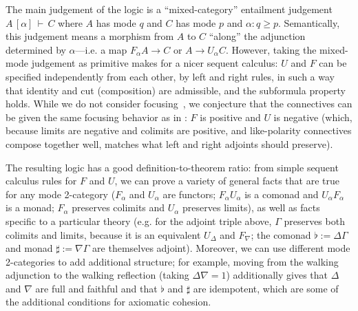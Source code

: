 \documentclass{drl-common/llncs}
\newcommand\seq[3]{\ensuremath{#1 \, [ #2 ] \, \vdash \, #3}}
\begin{document}
The main judgement of the logic is a ``mixed-category'' entailment
judgement \seq{A}{\alpha}{C} where $A$ has mode $q$ and $C$ has mode $p$
and $\alpha : q \ge p$.  Semantically, this judgement means a morphism
from $A$ to $C$ ``along'' the adjunction determined by $\alpha$---i.e. a
map $F_\alpha A \to C$ or $A \to U_\alpha C$.
However, taking the mixed-mode judgement as
primitive makes for a nicer sequent calculus: $U$ and $F$ can be
specified independently from each other, by left and right rules, in
such a way that identity and cut (composition) are admissible, and the
subformula property holds.  While we do not consider
focusing~\citep{andreoli92focus}, we conjecture that the connectives can
be given the same focusing behavior as in \citep{reed09adjoint}: $F$ is
positive and $U$ is negative (which, because limits are negative and
colimits are positive, and like-polarity connectives compose together
well, matches what left and right adjoints should preserve).

The resulting logic has a good definition-to-theorem ratio: from 
simple sequent calculus rules for $F$ and $U$, we can prove a variety of
general facts that are true for any mode 2-category ($F_\alpha$ and
$U_\alpha$ are functors; $F_\alpha U_\alpha$ is a comonad and $U_\alpha
F_\alpha$ is a monad; $F_\alpha$ preserves colimits and $U_\alpha$
preserves limits), as well as facts specific to a particular theory
(e.g. for the adjoint triple above, $\Gamma$ preserves both colimits
and limits, because it is an equivalent $U_\Delta$ and $F_\nabla$; the
comonad $\flat := \Delta\Gamma$ and monad $\sharp := \nabla\Gamma$ are
themselves adjoint).  Moreover, we can use different mode 2-categories
to add additional structure; for example, moving from the walking
adjunction to the walking reflection (taking $\Delta \nabla = 1$)
additionally gives that $\Delta$ and $\nabla$ are full and faithful and
that $\flat$ and $\sharp$ are idempotent, which are some of the
additional conditions for axiomatic cohesion.
\end{document}
